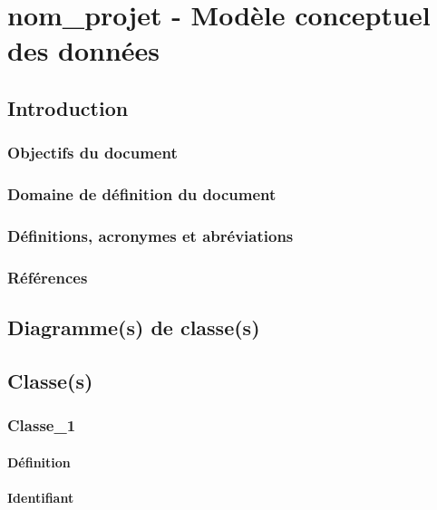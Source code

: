 \documentclass[a4paper, 11pt]{report}
\begin{document}

\tableofcontents

\chapter{nom\_projet - Modèle conceptuel des données}

\section{Introduction}

\subsection{Objectifs du document}

\subsection{Domaine de définition du document}

\subsection{Définitions, acronymes et abréviations}

\subsection{Références}

\newpage
\section{Diagramme(s) de classe(s)}

\newpage
\section{Classe(s)}

\subsection{Classe\_1}

\subsubsection{Définition}

\subsubsection{Identifiant}
\end{document}
